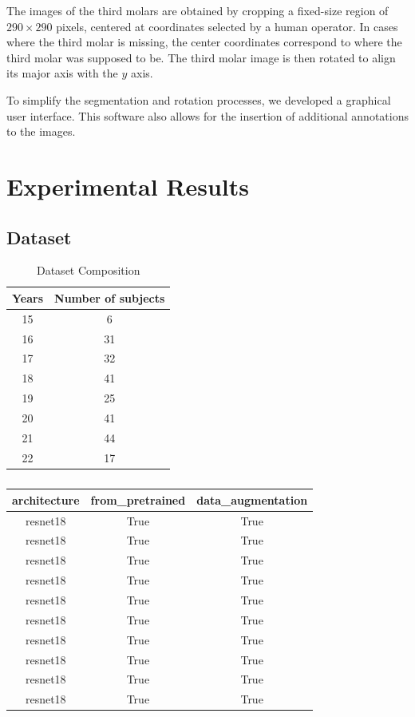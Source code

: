 \documentclass[conference]{IEEEtran}
\begin{document}
The images of the third molars are obtained by cropping a fixed-size region of $290 \times 290$ pixels, centered at coordinates selected by a human operator. In cases where the third molar is missing, the center coordinates correspond to where the third molar was supposed to be. The third molar image is then rotated to align its major axis with the $y$ axis.

To simplify the segmentation and rotation processes, we developed a graphical user interface. This software also allows for the insertion of additional annotations to the images.

\section{Experimental Results}
\subsection{Dataset}

\begin{table}[t]
	\centering
	\caption{Dataset Composition}
	\begin{tabular}{cc}
		\hline
		\hline
		Years & Number of subjects \\
		\hline
		15    & 6 \\
		16    & 31 \\
		17    & 32 \\
		18    & 41 \\
		19    & 25 \\
		20    & 41 \\
		21    & 44 \\
		22    & 17 \\
		\hline
		\hline
	\end{tabular}%
	\label{tabDB}%
\end{table}%

\begin{table}[t]
	\centering
	\caption{}
	\begin{tabular}{ccc}
		\hline
		\hline
		architecture & from\_pretrained & data\_augmentation \\ 
		\hline
		resnet18 & True & True \\ 
		resnet18 & True & True \\ 
		resnet18 & True & True \\ 
		resnet18 & True & True \\ 
		resnet18 & True & True \\ 
		resnet18 & True & True \\ 
		resnet18 & True & True \\ 
		resnet18 & True & True \\ 
		resnet18 & True & True \\ 
		resnet18 & True & True \\ 
		\hline
		\hline
	\end{tabular}
	\label{tab:hyperparameters}
\end{table}
	
\end{document}
